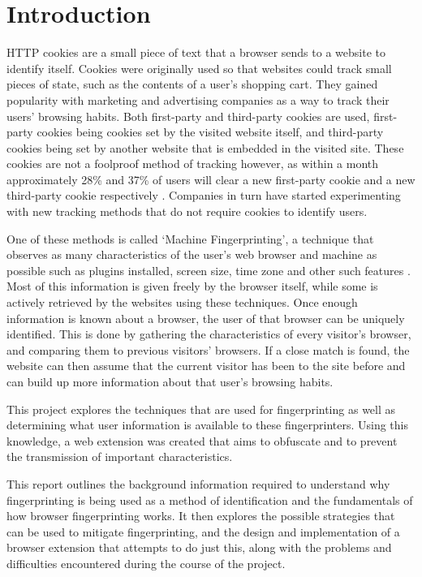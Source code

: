\chapter{Introduction}

HTTP cookies are a small piece of text that a browser sends to a website to identify itself.
Cookies were originally used so that websites could track small pieces of state, such as the contents of a user's shopping cart.
They gained popularity with marketing and advertising companies as a way to track their users' browsing habits.
Both first-party and third-party cookies are used, first-party cookies being cookies set by the visited website itself, and third-party cookies being set by another website that is embedded in the visited site.
These cookies are not a foolproof method of tracking however, as within a month approximately 28\% and 37\% of users will clear a new first-party cookie and a new third-party cookie respectively \citep{comScore-cookies}.
Companies in turn have started experimenting with new tracking methods that do not require cookies to identify users.

One of these methods is called `Machine Fingerprinting', a technique that observes as many characteristics of the user's web browser and machine as possible such as plugins installed, screen size, time zone and other such features \citep{audio-fingerprint}.
Most of this information is given freely by the browser itself, while some is actively retrieved by the websites using these techniques.
Once enough information is known about a browser, the user of that browser can be uniquely identified.
This is done by gathering the characteristics of every visitor's browser, and comparing them to previous visitors' browsers.
If a close match is found, the website can then assume that the current visitor has been to the site before and can build up more information about that user's browsing habits.

This project explores the techniques that are used for fingerprinting as well as determining what user information is available to these fingerprinters.
Using this knowledge, a web extension was created that aims to obfuscate and to prevent the transmission of important characteristics.

This report outlines the background information required to understand why fingerprinting is being used as a method of identification and the fundamentals of how browser fingerprinting works.
It then explores the possible strategies that can be used to mitigate fingerprinting, and the design and implementation of a browser extension that attempts to do just this, along with the problems and difficulties encountered during the course of the project.

